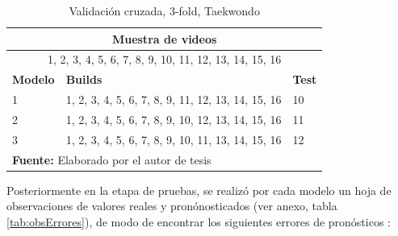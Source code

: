 \begin{table}[H]
\begin{center}
\caption{Validaci\'on cruzada, 3-fold,  Taekwondo}
\label{tab:KfoldTaekwondo}
\begin{tabular}{|l|l|l|}
\hline
\multicolumn{3}{|c|}{\textbf{Muestra de videos}} \\ \hline
\multicolumn{3}{|c|}{1, 2, 3, 4, 5, 6, 7, 8, 9, 10, 11, 12, 13, 14, 15, 16} \\ \hline
\textbf{Modelo} & \textbf{Builds} & \textbf{Test} \\ \hline
1 & 1, 2, 3, 4, 5, 6, 7, 8, 9, 11, 12, 13, 14, 15, 16 & 10 \\ \hline
2 & 1, 2, 3, 4, 5, 6, 7, 8, 9, 10, 12, 13, 14, 15, 16 & 11 \\ \hline
3 & 1, 2, 3, 4, 5, 6, 7, 8, 9, 10, 11, 13, 14, 15, 16 & 12 \\ \hline
\multicolumn{3}{l}{\textbf{Fuente:} Elaborado por el autor de tesis}
\end{tabular}
\end{center}
\end{table}
Posteriormente en la etapa de pruebas, se realiz\'o  por cada modelo un hoja de observaciones de valores reales y pron\'onosticados (ver anexo, tabla \ref{tab:obsErrores}), de modo de encontrar los siguientes errores de pron\'osticos \cite{erroresPronostico}:
